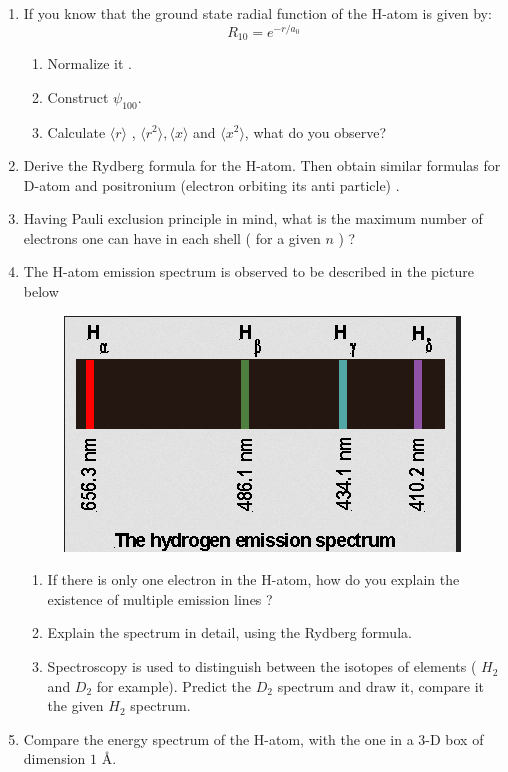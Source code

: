 \begin{enumerate}
	\item If you know that the ground state radial function of the H-atom is given by:
	\[ R_{10}= e^{-r/a_0}\]
	\begin{enumerate}
		\item Normalize it .
		\item Construct $\psi_{100}$.
		\item Calculate $\langle r \rangle$ , $ \langle r^2\rangle, \langle x\rangle $ and $\langle x^2\rangle$, what do you observe?  
	\end{enumerate}
	\item Derive the Rydberg formula for the H-atom. Then obtain similar formulas for D-atom and positronium (electron orbiting its anti particle) .
	\item Having Pauli exclusion principle in mind, what is the maximum number of electrons one can have in each shell ( for a given $n$ ) ?
	\item The H-atom  emission spectrum is observed to be described in the picture below
	\begin{figure}[h!]
		\centering
		\includegraphics[scale=0.6]{./figures/spectrum}
	\end{figure}
	\begin{enumerate}
		\item If there is only one electron in the H-atom, how do you explain the existence of multiple emission lines ?
		\item Explain the spectrum in detail, using the Rydberg formula.
		\item Spectroscopy is used to distinguish between the isotopes of elements ( $H_2$ and $ D_2$ for example). Predict the $D_2$ spectrum and draw it, compare it the given $H_2$ spectrum.
	\end{enumerate}
	\item Compare the energy spectrum of the H-atom, with the one in a 3-D box of dimension  $1$ \AA . 

\end{enumerate}
